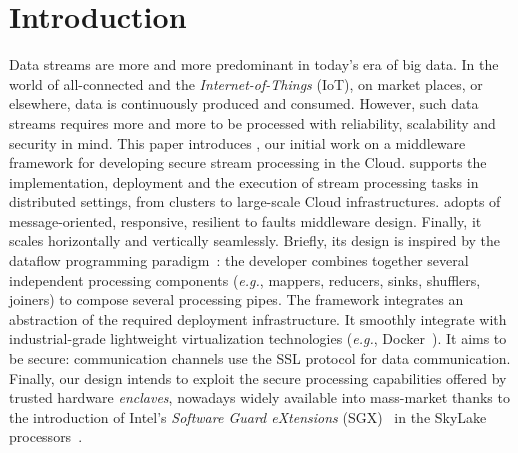 \section{Introduction}
\label{sec:introduction}


Data streams are more and more predominant in today's era of big data.
In the world of all-connected and the \emph{Internet-of-Things} (IoT), on market places, or elsewhere, data is continuously produced and consumed.
However, such data streams requires more and more to be processed with reliability, scalability and security in mind.
This paper introduces \SYS{}, our initial work on a middleware framework for developing secure stream processing in the Cloud.
\SYS{} supports the implementation, deployment and the execution of stream processing tasks in distributed settings, from clusters to large-scale Cloud infrastructures.
\SYS{} adopts of message-oriented, responsive, resilient to faults middleware design.
Finally, it scales horizontally and vertically seamlessly.
Briefly, its design is inspired by the dataflow programming paradigm~\cite{uustalu_essence_2005}: the developer combines together several independent processing components (\emph{e.g.}, mappers, reducers, sinks, shufflers, joiners) to compose several processing pipes.%
The framework integrates an abstraction of the required deployment infrastructure.
It smoothly integrate with industrial-grade lightweight virtualization technologies (\emph{e.g.}, Docker~\cite{docker}).
It aims to be secure: communication channels use the SSL protocol for data communication.
Finally, our design intends to exploit the secure processing capabilities offered by trusted hardware \emph{enclaves}, nowadays widely available into mass-market thanks to the introduction of Intel's \emph{Software Guard eXtensions} (SGX)~\cite{costan_intel} in the SkyLake processors~\cite{skylake}.


